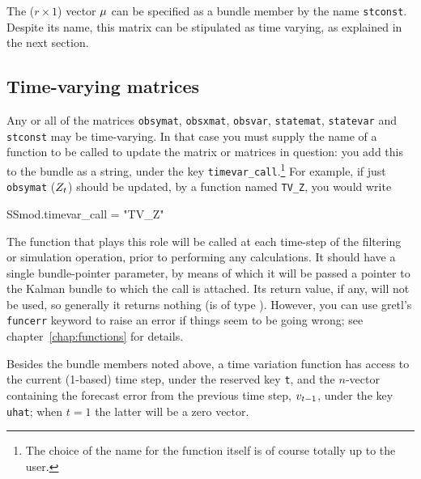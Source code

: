 The ($r \times 1$) vector $\mu$ can be specified as a bundle
member by the name \texttt{stconst}. Despite its name, this matrix can
be stipulated as time varying, as explained in the next section.

\subsection{Time-varying matrices}
\label{sec:tvarying}

Any or all of the matrices \texttt{obsymat}, \texttt{obsxmat},
\texttt{obsvar}, \texttt{statemat}, \texttt{statevar} and
\texttt{stconst} may be time-varying.  In that case you must supply
the name of a function to be called to update the matrix or matrices
in question: you add this to the bundle as a string, under the key
\texttt{timevar\_call}.\footnote{The choice of the name for the
  function itself is of course totally up to the user.} For example,
if just \texttt{obsymat} ($Z_t$) should be updated, by a
function named \texttt{TV\_Z}, you would write
%
\begin{code}
SSmod.timevar_call = "TV_Z"
\end{code}
%
The function that plays this role will be called at each time-step of
the filtering or simulation operation, prior to performing any
calculations. It should have a single bundle-pointer parameter, by
means of which it will be passed a pointer to the Kalman bundle to
which the call is attached.  Its return value, if any, will not be
used, so generally it returns nothing (is of type ).
However, you can use gretl's \texttt{funcerr} keyword to raise an
error if things seem to be going wrong; see
chapter~\ref{chap:functions} for details.

Besides the bundle members noted above, a time variation function has
access to the current (1-based) time step, under the reserved key
\texttt{t}, and the $n$-vector containing the forecast error from the
previous time step, $v_{t-1}$, under the key \texttt{uhat};
when $t=1$ the latter will be a zero vector.


